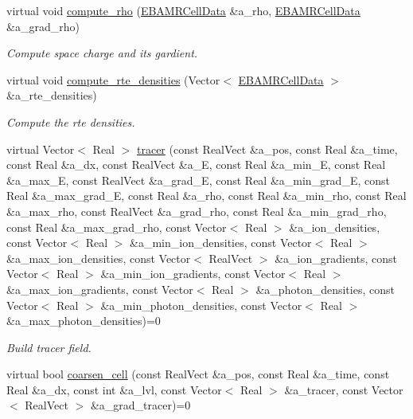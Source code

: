 \begin{DoxyCompactItemize}
virtual void \hyperlink{classfull__tagger_a5febd2b0f8cb3b341b76111383b03733}{compute\+\_\+rho} (\hyperlink{type__definitions_8H_a7e610f301989e5e07781c5e338bdb7c3}{E\+B\+A\+M\+R\+Cell\+Data} \&a\+\_\+rho, \hyperlink{type__definitions_8H_a7e610f301989e5e07781c5e338bdb7c3}{E\+B\+A\+M\+R\+Cell\+Data} \&a\+\_\+grad\+\_\+rho)
\begin{DoxyCompactList}\small\item\em Compute space charge and its gardient. \end{DoxyCompactList}\item 
virtual void \hyperlink{classfull__tagger_ab131e1048a39715d28888530d4f8c96a}{compute\+\_\+rte\+\_\+densities} (Vector$<$ \hyperlink{type__definitions_8H_a7e610f301989e5e07781c5e338bdb7c3}{E\+B\+A\+M\+R\+Cell\+Data} $>$ \&a\+\_\+rte\+\_\+densities)
\begin{DoxyCompactList}\small\item\em Compute the rte densities. \end{DoxyCompactList}\item 
virtual Vector$<$ Real $>$ \hyperlink{classfull__tagger_a7dfd539bf3a0eb9efb178ffb31dffafc}{tracer} (const Real\+Vect \&a\+\_\+pos, const Real \&a\+\_\+time, const Real \&a\+\_\+dx, const Real\+Vect \&a\+\_\+E, const Real \&a\+\_\+min\+\_\+E, const Real \&a\+\_\+max\+\_\+E, const Real\+Vect \&a\+\_\+grad\+\_\+E, const Real \&a\+\_\+min\+\_\+grad\+\_\+E, const Real \&a\+\_\+max\+\_\+grad\+\_\+E, const Real \&a\+\_\+rho, const Real \&a\+\_\+min\+\_\+rho, const Real \&a\+\_\+max\+\_\+rho, const Real\+Vect \&a\+\_\+grad\+\_\+rho, const Real \&a\+\_\+min\+\_\+grad\+\_\+rho, const Real \&a\+\_\+max\+\_\+grad\+\_\+rho, const Vector$<$ Real $>$ \&a\+\_\+ion\+\_\+densities, const Vector$<$ Real $>$ \&a\+\_\+min\+\_\+ion\+\_\+densities, const Vector$<$ Real $>$ \&a\+\_\+max\+\_\+ion\+\_\+densities, const Vector$<$ Real\+Vect $>$ \&a\+\_\+ion\+\_\+gradients, const Vector$<$ Real $>$ \&a\+\_\+min\+\_\+ion\+\_\+gradients, const Vector$<$ Real $>$ \&a\+\_\+max\+\_\+ion\+\_\+gradients, const Vector$<$ Real $>$ \&a\+\_\+photon\+\_\+densities, const Vector$<$ Real $>$ \&a\+\_\+min\+\_\+photon\+\_\+densities, const Vector$<$ Real $>$ \&a\+\_\+max\+\_\+photon\+\_\+densities)=0
\begin{DoxyCompactList}\small\item\em Build tracer field. \end{DoxyCompactList}\item 
virtual bool \hyperlink{classfull__tagger_aa4270040b0a8ce3ce536583deb1ddd33}{coarsen\+\_\+cell} (const Real\+Vect \&a\+\_\+pos, const Real \&a\+\_\+time, const Real \&a\+\_\+dx, const int \&a\+\_\+lvl, const Vector$<$ Real $>$ \&a\+\_\+tracer, const Vector$<$ Real\+Vect $>$ \&a\+\_\+grad\+\_\+tracer)=0

\end{DoxyCompactItemize}
